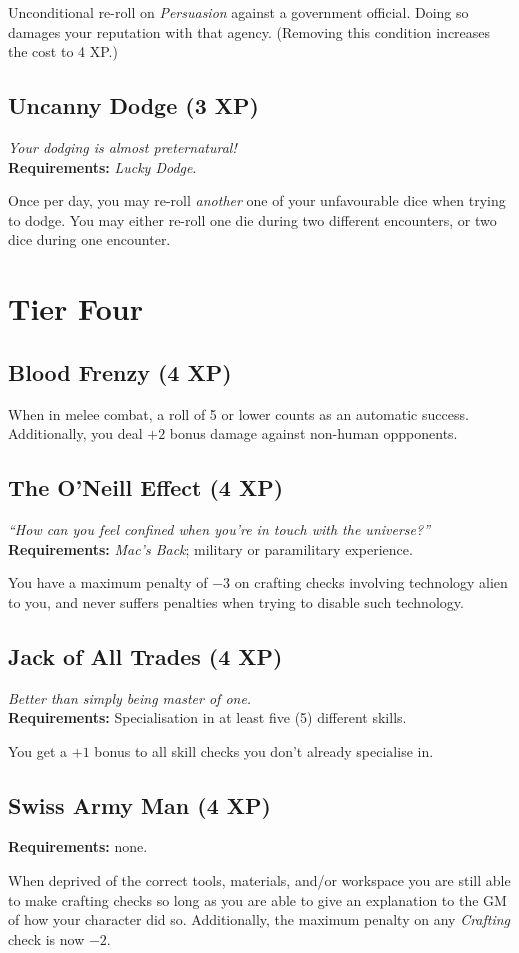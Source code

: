 Unconditional re-roll on \textit{Persuasion} against a government official.
Doing so damages your reputation with that agency.
(Removing this condition increases the cost to 4 XP.)

\subsection{Uncanny Dodge (3 XP)}
\textit{Your dodging is almost preternatural!}\\
\textbf{Requirements:} \textit{Lucky Dodge}.

Once per day, you may re-roll \textit{another} one of your unfavourable dice when trying to dodge.
You may either re-roll one die during two different encounters, or two dice during one encounter.

\section{Tier Four}

\subsection{Blood Frenzy (4 XP)}
When in melee combat, a roll of 5 or lower counts as an automatic success.
Additionally, you deal $+2$ bonus damage against non-human oppponents.

\subsection{The O'Neill Effect (4 XP)}
\textit{``How can you feel confined when you're in touch with the universe?''}\\
\textbf{Requirements:} \textit{Mac's Back}; military or paramilitary experience. 

You have a maximum penalty of $-3$ on crafting checks involving technology alien to you, and never suffers penalties when trying to disable such technology.

\subsection{Jack of All Trades (4 XP)}
\textit{Better than simply being master of one.}\\
\textbf{Requirements:} Specialisation in at least five (5) different skills.

You get a $+1$ bonus to all skill checks you don't already specialise in.

\subsection{Swiss Army Man (4 XP)}
\textbf{Requirements:} none.

When deprived of the correct tools, materials, and/or workspace you are still able to make crafting checks so long as you are able to give an explanation to the GM of how your character did so.
Additionally, the maximum penalty on any \textit{Crafting} check is now $-2$.